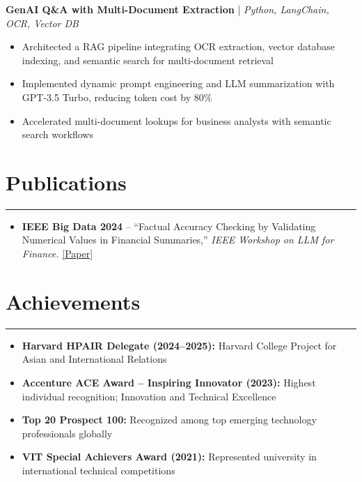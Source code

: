 \documentclass[9pt]{extarticle}
\begin{document}
\vspace{2pt}
\textbf{GenAI Q\&A with Multi-Document Extraction} | \textit{Python, LangChain, OCR, Vector DB}
\begin{itemize}
    \item Architected a RAG pipeline integrating OCR extraction, vector database indexing, and semantic search for multi-document retrieval
    \item Implemented dynamic prompt engineering and LLM summarization with GPT-3.5 Turbo, reducing token cost by 80\%
    \item Accelerated multi-document lookups for business analysts with semantic search workflows
\end{itemize}

\section{Publications}
\vspace{-6pt}\hrule\vspace{4pt}
\begin{itemize}
    \item \textbf{IEEE Big Data 2024} -- ``Factual Accuracy Checking by Validating Numerical Values in Financial Summaries,'' \textit{IEEE Workshop on LLM for Finance.} \href{https://ieeexplore.ieee.org/document/10825697/}{[Paper]}
\end{itemize}


\section{Achievements}
\vspace{-6pt}\hrule\vspace{4pt}
\begin{itemize}
    \item \textbf{Harvard HPAIR Delegate (2024--2025):} Harvard College Project for Asian and International Relations
    \item \textbf{Accenture ACE Award -- Inspiring Innovator (2023):} Highest individual recognition; Innovation and Technical Excellence
    \item \textbf{Top 20 Prospect 100:} Recognized among top emerging technology professionals globally
    \item \textbf{VIT Special Achievers Award (2021):} Represented university in international technical competitions
\end{itemize}
\end{document}
